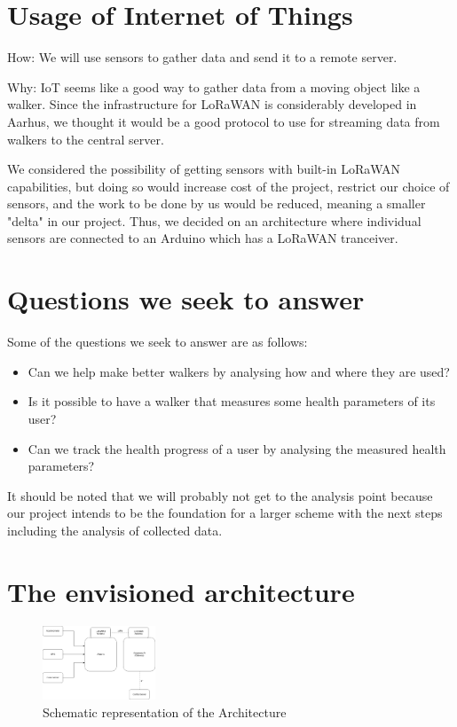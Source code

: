 \documentclass[conference]{IEEEtran}
\begin{document}
\section{Usage of Internet of Things}

How: We will use sensors to gather data and send it to a remote server.
	
Why: IoT seems like a good way to gather data from a moving object like a walker. Since the infrastructure for LoRaWAN is considerably developed in Aarhus, we thought it would be a good protocol to use for streaming data from walkers to the central server.

We considered the possibility of getting sensors with built-in LoRaWAN capabilities, but doing so would increase cost of the project, restrict our choice of sensors, and the work to be done by us would be reduced, meaning a smaller "delta" in our project. Thus, we decided on an architecture where individual sensors are connected to an Arduino which has a LoRaWAN tranceiver.


\section{Questions we seek to answer}
Some of the questions we seek to answer are as follows:

\begin{itemize}
	\item Can we help make better walkers by analysing how and where they are used?
	
	\item Is it possible to have a walker that measures some health parameters of its user? 
	
	\item Can we track the health progress of a user by analysing the measured health parameters?
\end{itemize}

It should be noted that we will probably not get to the analysis point because our project intends to be the foundation for a larger scheme with the next steps including the analysis of collected data.

\section{The envisioned architecture}

\begin{figure}[H]
	\begin{center}
		\includegraphics[width=0.3\textwidth]{images/Architecture.png}
		\caption[]{Schematic representation of the Architecture}
	\end{center}	
\end{figure}
\end{document}
